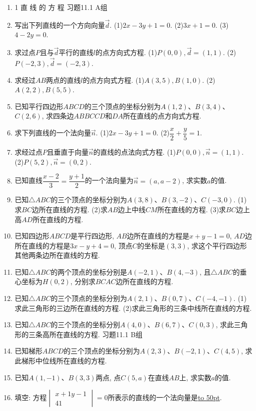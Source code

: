 \documentclass[10pt,a4paper]{article}
\newcommand{\blank}[1]{\underline{\hbox to #1pt{}}}
\begin{document}
\begin{enumerate}[1.]


\item 1  直 线 的 方 程
习题11.1  A组
\item 写出下列直线的一个方向向量$\overrightarrow d$.
(1)$2x-3y+1=0$.						(2)$3x+1=0$.
(3)$4-2y=0$.
\item 求过点$P$且与$\overrightarrow d$平行的直线$l$的点方向式方程.
(1)$P(0,0),\overrightarrow d=(1,1)$.					(2)$P(-2,3),\overrightarrow d=(-2,3)$.
\item 求经过$AB$两点的直线$l$的点方向式方程.
(1)$A(3,5),B(1,0)$.						(2)$A(2,2),B(5,5)$.
\item 已知平行四边形$ABCD$的三个顶点的坐标分别为$A(1,2)$、$B(3,4)$、$C(2,6)$, 求四条边$ABBCCD$和$DA$所在直线的点方向式方程.
\item 求下列直线的一个法向量$\overrightarrow n$.
(1)$2x-3y+1=0$.						(2)$\dfrac x2+\dfrac y5=1$.
\item 求经过点$P$且垂直于向量$\overrightarrow n$的直线的点法向式方程.
(1)$P(0,0),\overrightarrow n=(1,1)$.					(2)$P(5,2),\overrightarrow n=(0,2)$.
\item 已知直线$\dfrac{x-2}3=\dfrac{y+1}2$的一个法向量为$\overrightarrow n=(a,a-2)$, 求实数$a$的值.
\item 已知$\triangle ABC$的三个顶点的坐标分别为$A(3,8)$、$B(3,-2)$、$C(-3,0)$.
(1)求$BC$边所在直线的方程.
(2)求$AB$边上中线$CM$所在直线的方程.
(3)求$BC$边上高$AD$所在直线的方程.
\item 已知四边形$ABCD$是平行四边形, $AB$边所在直线的方程是$x+y-1=0$, $AD$边所在直线的方程是$3x-y+4=0$, 顶点$C$的坐标是$(3,3)$, 求这个平行四边形其他两条边所在直线的方程.
\item 已知$\triangle ABC$的两个顶点的坐标分别是$A(-2,1)$、$B(4,-3)$, 且$\triangle ABC$的垂心坐标为$H(0,2)$, 分别求$BCAC$边所在直线的方程.
\item 已知$\triangle ABC$的三个顶点的坐标分别为$A(2,1)$、$B(0,7)$、$C(-4,-1)$.
(1)求此三角形的三边所在直线的方程.
(2)求此三角形的三条中线所在直线的方程.
\item 已知$\triangle ABC$的三个顶点的坐标分别$A(4,0)$、$B(6,7)$、$C(0,3)$, 求此三角形的三条高所在直线的方程.
习题11.1  B组
\item 已知梯形$ABCD$的三个顶点的坐标分别为$A(2,3)$、$B(-2,1)$、$C(4,5)$, 求此梯形中位线所在直线的方程.
\item 已知$A(1,-1)$、$B(3,3)$两点, 点$C(5,a)$在直线$AB$上, 求实数$a$的值.
\item 填空:
方程$\begin{vmatrix}
    x+1  y-1  \\4  1  \end{vmatrix}=0$所表示的直线的一个法向量是\blank{50}.

\end{enumerate}
\end{document}
